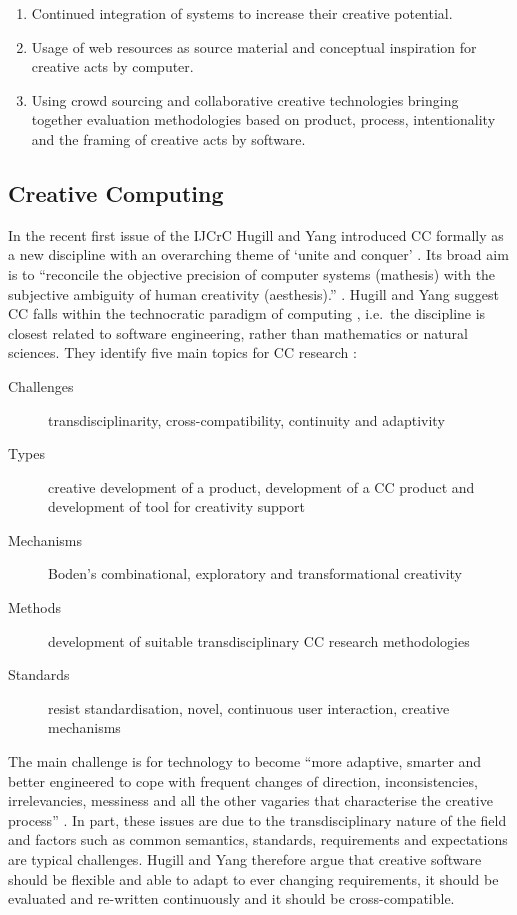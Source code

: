\begin{enumerate}
  \item Continued integration of systems to increase their creative potential.
  \item Usage of web resources as source material and conceptual inspiration for creative acts by computer.
  \item Using crowd sourcing and collaborative creative technologies bringing together evaluation methodologies based on product, process, intentionality and the framing of creative acts by software.
\end{enumerate}


\subsection{Creative Computing}
\label{s:creacomp}

In the recent first issue of the \ac{IJCrC} Hugill and Yang introduced \ac{CC} formally as a new discipline \citeyear{Hugill2013c} with an overarching theme of `unite and conquer' \autocite[p.1, his emphasis]{Yang2013}. Its broad aim is to ``reconcile the objective precision of computer systems (mathesis) with the subjective ambiguity of human creativity (aesthesis).'' \autocite[p.5]{Hugill2013c}. Hugill and Yang suggest \ac{CC} falls within the technocratic paradigm of computing \autocite[see also][p.8]{Eden2007}, i.e.\ the discipline is closest related to software engineering, rather than mathematics or natural sciences. They identify five main topics for \ac{CC} research \autocite[p.15-17]{Hugill2013c}:

\begin{description}
  \item [Challenges] transdisciplinarity, cross-compatibility, continuity and adaptivity
  \item [Types] creative development of a product, development of a \ac{CC} product and development of tool for creativity support
  \item [Mechanisms]	Boden’s combinational, exploratory and transformational creativity
  \item [Methods] development of suitable transdisciplinary \ac{CC} research methodologies
  \item [Standards] resist standardisation, novel, continuous user interaction, creative mechanisms
\end{description}

The main challenge is for technology  to become ``more adaptive, smarter and better engineered to cope with frequent changes of direction, inconsistencies, irrelevancies, messiness and all the other vagaries that characterise the creative process'' \autocite[p.5]{Hugill2013c}. In part, these issues are due to the transdisciplinary nature of the field and factors such as common semantics, standards, requirements and expectations are typical challenges. Hugill and Yang therefore argue that creative software should be flexible and able to adapt to ever changing requirements, it should be evaluated and re-written continuously and it should be cross-compatible.

